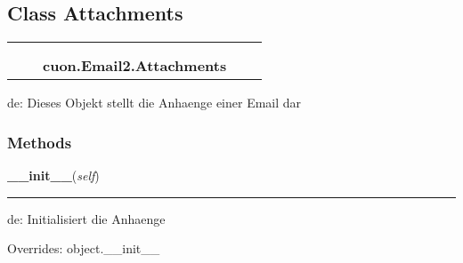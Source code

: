 

\subsection{Class Attachments}

    \label{cuon:Email2:Attachments}
\begin{tabular}{cccccc}
\multicolumn{2}{r}{\settowidth{\BCL}{object}\multirow{2}{\BCL}{object}}
&&
  \\\cline{3-3}
  &&\multicolumn{1}{c|}{}
&&
  \\
&&\multicolumn{2}{l}{\textbf{cuon.Email2.Attachments}}
\end{tabular}

de: Dieses Objekt stellt die Anhaenge einer Email dar



  \subsubsection{Methods}

    \vspace{0.5ex}

\hspace{.8\funcindent}\begin{boxedminipage}{\funcwidth}

    \raggedright \textbf{\_\_init\_\_}(\textit{self})

    \vspace{-1.5ex}

    \rule{\textwidth}{0.5\fboxrule}
\setlength{\parskip}{2ex}
    de: Initialisiert die Anhaenge

\setlength{\parskip}{1ex}
      Overrides: object.\_\_init\_\_

    \end{boxedminipage}

